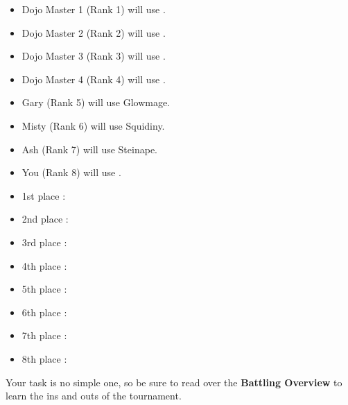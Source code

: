 \begin{multicols}{2}\small
\begin{itemize}
  \item Dojo Master 1 (Rank 1) will use \underline{\hspace{6em}}.
  \item Dojo Master 2 (Rank 2) will use \underline{\hspace{6em}}.
  \item Dojo Master 3 (Rank 3) will use \underline{\hspace{6em}}.
  \item Dojo Master 4 (Rank 4) will use \underline{\hspace{6em}}.
  \item Gary (Rank 5) will use Glowmage.
  \item Misty (Rank 6) will use Squidiny.
  \item Ash (Rank 7) will use Steinape.
  \item You (Rank 8) will use \underline{\hspace{6em}}.
\end{itemize}
\begin{itemize}
  \item 1st place \mappMobimon{}: \underline{\hspace{10em}}
  \item 2nd place \mappMobimon{}: \underline{\hspace{10em}}
  \item 3rd place \mappMobimon{}: \underline{\hspace{10em}}
  \item 4th place \mappMobimon{}: \underline{\hspace{10em}}
  \item 5th place \mappMobimon{}: \underline{\hspace{10em}}
  \item 6th place \mappMobimon{}: \underline{\hspace{10em}}
  \item 7th place \mappMobimon{}: \underline{\hspace{10em}}
  \item 8th place \mappMobimon{}: \underline{\hspace{10em}}
\end{itemize}
\end{multicols}

Your task is no simple one, so be sure to read over the
\textbf{\mappMobimon{} Battling Overview} to learn the ins and outs
of the tournament.

